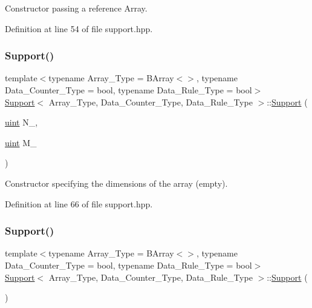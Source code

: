 Constructor passing a reference Array. 



Definition at line 54 of file support.\+hpp.

\mbox{\label{class_support_a1f6a7ae36567effe999602df879321cd}} 
\subsubsection{\texorpdfstring{Support()}{Support()}\hspace{0.1cm}{\footnotesize\ttfamily [2/3]}}
{\footnotesize\ttfamily template$<$typename Array\+\_\+\+Type = B\+Array$<$$>$, typename Data\+\_\+\+Counter\+\_\+\+Type = bool, typename Data\+\_\+\+Rule\+\_\+\+Type = bool$>$ \\
\hyperlink{class_support}{Support}$<$ Array\+\_\+\+Type, Data\+\_\+\+Counter\+\_\+\+Type, Data\+\_\+\+Rule\+\_\+\+Type $>$\+::\hyperlink{class_support}{Support} (\begin{DoxyParamCaption}\item[{\hyperlink{typedefs_8hpp_a91ad9478d81a7aaf2593e8d9c3d06a14}{uint}}]{N\+\_\+,  }\item[{\hyperlink{typedefs_8hpp_a91ad9478d81a7aaf2593e8d9c3d06a14}{uint}}]{M\+\_\+ }\end{DoxyParamCaption})\hspace{0.3cm}{\ttfamily [inline]}}



Constructor specifying the dimensions of the array (empty). 



Definition at line 66 of file support.\+hpp.

\mbox{\label{class_support_a489bf1d96a2ae1e8494eb94d8d366e3f}} 
\subsubsection{\texorpdfstring{Support()}{Support()}\hspace{0.1cm}{\footnotesize\ttfamily [3/3]}}
{\footnotesize\ttfamily template$<$typename Array\+\_\+\+Type = B\+Array$<$$>$, typename Data\+\_\+\+Counter\+\_\+\+Type = bool, typename Data\+\_\+\+Rule\+\_\+\+Type = bool$>$ \\
\hyperlink{class_support}{Support}$<$ Array\+\_\+\+Type, Data\+\_\+\+Counter\+\_\+\+Type, Data\+\_\+\+Rule\+\_\+\+Type $>$\+::\hyperlink{class_support}{Support} (\begin{DoxyParamCaption}{ }\end{DoxyParamCaption})\hspace{0.3cm}{\ttfamily [inline]}}



